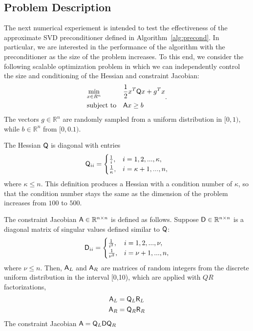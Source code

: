 \subsection{Problem Description}
The next numerical experiement is intended to test the effectiveness of the approximate SVD
preconditioner defined in Algorithm~\ref{alg:precond}.  In particular, we are
interested in the performance of the algorithm with the preconditioner as the size of the problem increases.  
To this end, we consider the following scalable optimization problem
in which we can independently control the size and conditioning of the Hessian
and constraint Jacobian:
\begin{equation}\label{eq:quadra}
  \begin{aligned}
    &\underset{x \in R^n} {\text{min}}  
    & & \frac{1}{2}x^T \mathsf{Q} x + g^T x \\
    &\text{subject to} & & \mathsf{A}x \geq b  \\
  \end{aligned}.
\end{equation}
The vectors $g\in \mathbb{R}^{n}$ are randomly sampled from a uniform distribution 
in $[ 0,1)$, while $b \in \mathbb{R}^{n}$ from $[0,0.1)$. 

The Hessian $\mathsf{Q}$ is diagonal with entries
\begin{equation*}
  \mathsf{Q}_{ii} = \begin{cases}
    \frac{1}{i}, &  i = 1, 2, ...,  \kappa, \\
    \frac{1}{\kappa}, & i =  \kappa+1, ... , n, \\
  \end{cases}
\end{equation*}
where $\kappa \leq n$.  This definition produces a Hessian with a condition
number of $\kappa$,  so that the condition number
stays the same as the dimension of the problem increases from $100$ to $500$. 

The constraint Jacobian $\mathsf{A} \in \mathbb{R}^{n\times n}$ is defined as follows. Suppose
$\mathsf{D} \in \mathbb{R}^{n\times n}$ is a diagonal
matrix of singular values defined similar to $\mathsf{Q}$:
\begin{equation*}
  \mathsf{D}_{ii} = \begin{cases}
    \frac{1}{i^2}, &  i = 1,2,...,\nu, \\
    \frac{1}{\nu^2}, & i = \nu+1, ..., n, \\
  \end{cases}
\end{equation*}
where $\nu \leq n$.  Then, $\mathsf{A}_L $ and $\mathsf{A}_R$ are matrices of random integers from 
the discrete uniform distribution in the
interval [0,10),  which are applied with $QR$ factorizations,  
\begin{equation*}
\begin{aligned}
\mathsf{A}_L &= \mathsf{Q}_L \mathsf{R}_L \\
\mathsf{A}_R &= \mathsf{Q}_R \mathsf{R}_R \\
\end{aligned}
\end{equation*}
The constraint Jacobian $\mathsf{A} =\mathsf{Q}_L  \mathsf{D} \mathsf{Q}_R $ 

